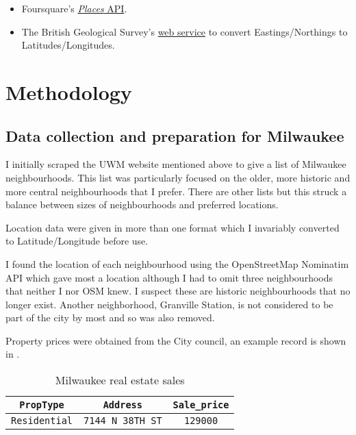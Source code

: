 \documentclass[a4paper,12pt,final,UKenglish]{article}
\begin{document}
\begin{itemize}
            \item Foursquare’s \href{https://developer.foursquare.com/docs/places-api/}{\textit{Places} API}.
            
            \item The British Geological Survey’s \href{https://www.bgs.ac.uk/data/webservices/convertForm.cfm}{web service} to convert Eastings/Northings to Latitudes/Longitudes.
        \end{itemize}

    \section{Methodology}
        \subsection{Data collection and preparation for Milwaukee}
            I initially scraped the UWM website mentioned above to give a list of Milwaukee neighbourhoods.
            This list was particularly focused on the older, more historic and more central neighbourhoods that I prefer.
            There are other lists but this struck a balance between sizes of neighbourhoods and preferred locations.

            Location data were given in more than one format which I invariably converted to Latitude/Longitude before use.
            
            I found the location of each neighbourhood using the OpenStreetMap Nominatim API which gave most a location although
            I had to omit three neighbourhoods that neither I nor OSM knew.
            I suspect these are historic neighbourhoods that no longer exist.
            Another neighborhood, Granville Station, is not considered to be part of the city by most and so was also removed.
            
            Property prices were obtained from the City council, an example record is shown in .
            \begin{table}[ht]
                \centering
                \begin{tabular}{c|c|c}
                    \texttt{PropType}       & \texttt{Address}          & \texttt{Sale\_price}\\\hline
                    \texttt{Residential}    & \texttt{7144 N 38TH ST}   & \texttt{129000}
                \end{tabular}
                \caption{Milwaukee real estate sales\label{fig:salesdata}}
            \end{table}
            
\end{document}
